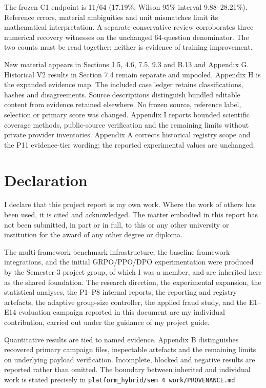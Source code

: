 The frozen C1 endpoint is 11/64 (17.19\%; Wilson 95\% interval 9.88--28.21\%). Reference errors, material ambiguities and unit mismatches limit its mathematical interpretation. A separate conservative review corroborates three numerical recovery witnesses on the unchanged 64-question denominator. The two counts must be read together; neither is evidence of training improvement.

New material appears in Sections 1.5, 4.6, 7.5, 9.3 and B.13 and Appendix G. Historical V2 results in Section 7.4 remain separate and unpooled. Appendix H is the expanded evidence map. The included case ledger retains classifications, hashes and disagreements. Source descriptions distinguish bundled editable content from evidence retained elsewhere. No frozen source, reference label, selection or primary score was changed. Appendix I reports bounded scientific coverage methods, public-source verification and the remaining limits without private provider inventories. Appendix A corrects historical registry scope and the P11 evidence-tier wording; the reported experimental values are unchanged.

\chapter*{Declaration}
\thispagestyle{plain}

I declare that this project report is my own work. Where the work of others has
been used, it is cited and acknowledged. The matter embodied in this report has
not been submitted, in part or in full, to this or any other university or
institution for the award of any other degree or diploma.

The multi-framework benchmark infrastructure, the baseline framework
integrations, and the initial GRPO/PPO/DPO experimentation were produced by the
Semester-3 project group, of which I was a member, and are inherited here as
the shared foundation. The research direction, the experimental expansion, the
statistical analyses, the P1--P8 internal reports, the reporting and registry
artefacts, the adaptive group-size controller, the applied fraud study, and the
E1--E14 evaluation campaign reported in this document are my
individual contribution, carried out under the guidance of my project guide.

Quantitative results are tied to named evidence. Appendix B distinguishes
recovered primary campaign files, inspectable artefacts and the remaining
limits on underlying payload verification. Incomplete, blocked and negative
results are reported rather than omitted. The boundary between inherited and
individual work is stated precisely in \texttt{platform\_hybrid/sem 4
work/PROVENANCE.md}.

